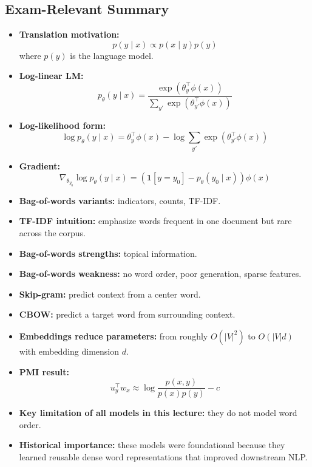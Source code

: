 \documentclass[11pt]{article}
\begin{document}
\subsection{Exam-Relevant Summary}
\begin{itemize}
    \item \textbf{Translation motivation:}
    \[
    p(y \mid x) \propto p(x \mid y)p(y)
    \]
    where \(p(y)\) is the language model.
    \item \textbf{Log-linear LM:}
    \[
    p_\theta(y \mid x) = \frac{\exp(\theta_y^\top \phi(x))}{\sum_{y'} \exp(\theta_{y'}^\top \phi(x))}
    \]
    \item \textbf{Log-likelihood form:}
    \[
    \log p_\theta(y \mid x) = \theta_y^\top \phi(x) - \log \sum_{y'} \exp(\theta_{y'}^\top \phi(x))
    \]
    \item \textbf{Gradient:}
    \[
    \nabla_{\theta_{y_0}} \log p_\theta(y \mid x)
    = \left(\mathbf{1}[y=y_0] - p_\theta(y_0 \mid x)\right)\phi(x)
    \]
    \item \textbf{Bag-of-words variants:} indicators, counts, TF-IDF.
    \item \textbf{TF-IDF intuition:} emphasize words frequent in one document but rare across the corpus.
    \item \textbf{Bag-of-words strengths:} topical information.
    \item \textbf{Bag-of-words weakness:} no word order, poor generation, sparse features.
    \item \textbf{Skip-gram:} predict context from a center word.
    \item \textbf{CBOW:} predict a target word from surrounding context.
    \item \textbf{Embeddings reduce parameters:} from roughly \(O(|V|^2)\) to \(O(|V|d)\) with embedding dimension \(d\).
    \item \textbf{PMI result:}
    \[
    u_y^\top w_x \approx \log \frac{p(x,y)}{p(x)p(y)} - c
    \]
    \item \textbf{Key limitation of all models in this lecture:} they do not model word order.
    \item \textbf{Historical importance:} these models were foundational because they learned reusable dense word representations that improved downstream NLP.
\end{itemize}
\end{document}
